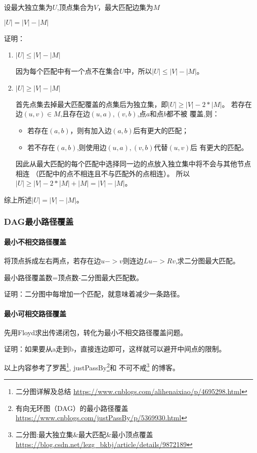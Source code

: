 设最大独立集为$U$,顶点集合为$V$，最大匹配边集为$M$

\begin{theorem}
	$|U|=|V|-|M|$
\end{theorem}

证明：

\begin{enumerate}
	\item \begin{lemma}
		      $|U|\leq |V|-|M|$
          \end{lemma}
          因为每个匹配中有一个点不在集合$U$中，所以$|U|\leq |V|-|M|$。
	\item \begin{lemma}
		      $|U|\geq |V|-|M|$
          \end{lemma}
          首先点集去掉最大匹配覆盖的点集后为独立集，即$|U|\geq |V|-2*|M|$。
          若存在边$(u,v)\in M$,且存在边$(u,a),(v,b)$,点$a$和点$b$都不被
          覆盖,则：
          \begin{itemize}
              \item 若存在$(a,b)$，则有加入边$(a,b)$后有更大的匹配；
              \item 若不存在$(a,b)$,则使用边$(u,a),(v,b)$代替$(u,v)$后
              有更大的匹配。
          \end{itemize}
          因此从最大匹配的每个匹配中选择同一边的点放入独立集中将不会与其他节点相连
          （匹配中的点不相连且不与匹配外的点相连）。
          所以$|U|\geq |V|-2*|M|+|M|=|V|-|M|$。
\end{enumerate}

综上所述$|U|=|V|-|M|$。

\subsubsection{DAG最小路径覆盖}

\paragraph{最小不相交路径覆盖}

将顶点拆成左右两点，若存在边$u->v$则连边$Lu->Rv$,求二分图最大匹配。

\begin{theorem}
	最小路径覆盖数=顶点数-二分图最大匹配数。
\end{theorem}

证明：二分图中每增加一个匹配，就意味着减少一条路径。

\paragraph{最小可相交路径覆盖}

先用Floyd求出传递闭包，转化为最小不相交路径覆盖问题。

证明：如果要从a走到b，直接连边即可，这样就可以避开中间点的限制。

以上内容参考了罗茜\footnote{二分图详解及总结
	\url{https://www.cnblogs.com/alihenaixiao/p/4695298.html}},
justPassBy\footnote{有向无环图（DAG）的最小路径覆盖
	\url{https://www.cnblogs.com/justPassBy/p/5369930.html}}和
不可不戒\footnote{二分图:最大独立集\&最大匹配\&最小顶点覆盖
	\url{https://blog.csdn.net/lezg\_bkbj/article/details/9872189}}
的博客。
